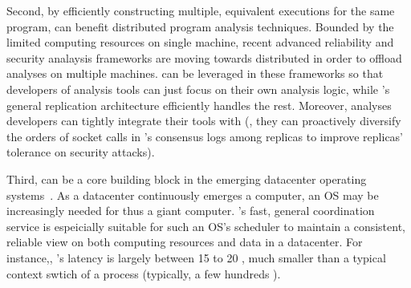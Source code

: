 
Second, by efficiently constructing multiple, equivalent executions for the 
same program, \xxx can benefit distributed program analysis techniques. Bounded 
by the limited computing resources on single machine, recent advanced 
reliability and security analaysis frameworks are moving towards distributed in 
order to offload analyses on multiple machines. \xxx can be leveraged in these 
frameworks so that developers of analysis tools can just focus on their own 
analysis logic, while \xxx's general replication architecture efficiently 
handles the rest. Moreover, analyses developers can tightly integrate their 
tools with \xxx (\eg, they can proactively diversify the orders of socket 
calls in \xxx's consensus logs among replicas to improve replicas' tolerance on
security attacks).

% 


Third, \xxx can be a core building block in the emerging datacenter operating 
systems~\cite{hotos15, mesos, web-article}. As a datacenter continuously 
emerges a computer, an OS may be increasingly needed for thus a giant 
computer. \xxx's fast, general coordination service is espeicially suitable 
for such an OS's scheduler to maintain a consistent, reliable view on both 
computing resources and data in a datacenter. For instance,, \xxx's latency is 
largely between 15 to 20 \us, much smaller than a typical context swtich of a 
process (typically, a few hundreds \us).

